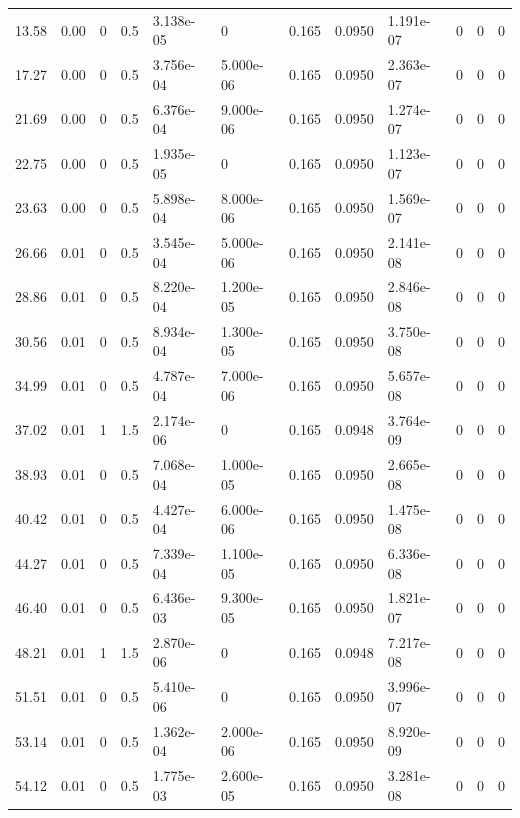 \documentclass[preview]{standalone}
\begin{document}
{{\begin{tabular}{L{1.2cm}C{1.2cm} C{0.3cm}C{0.5cm} C{1.4cm}C{1.4cm} C{1.4cm}C{1.4cm} C{1.6cm}C{1.6cm} C{1.6cm}C{1.6cm}}
  13.58  &  0.00  & 0     & 0.5 &  3.138e-05  & 0  &  0.165&   0.0950& 1.191e-07 & 0   &  0 & 0  \\ 
  17.27  &  0.00  & 0     & 0.5 &  3.756e-04  & 5.000e-06  &  0.165&   0.0950& 2.363e-07 & 0   &  0 & 0  \\ 
  21.69  &  0.00  & 0     & 0.5 &  6.376e-04  & 9.000e-06  &  0.165&   0.0950& 1.274e-07 & 0   &  0 & 0  \\ 
  22.75  &  0.00  & 0     & 0.5 &  1.935e-05  & 0  &  0.165&   0.0950& 1.123e-07 & 0   &  0 & 0  \\ 
  23.63  &  0.00  & 0     & 0.5 &  5.898e-04  & 8.000e-06  &  0.165&   0.0950& 1.569e-07 & 0   &  0 & 0  \\ 
  26.66  &  0.01  & 0     & 0.5 &  3.545e-04  & 5.000e-06  &  0.165&   0.0950& 2.141e-08 & 0   &  0 & 0  \\ 
  28.86  &  0.01  & 0     & 0.5 &  8.220e-04  & 1.200e-05  &  0.165&   0.0950& 2.846e-08 & 0   &  0 & 0  \\ 
  30.56  &  0.01  & 0     & 0.5 &  8.934e-04  & 1.300e-05  &  0.165&   0.0950& 3.750e-08 & 0   &  0 & 0  \\ 
  34.99  &  0.01  & 0     & 0.5 &  4.787e-04  & 7.000e-06  &  0.165&   0.0950& 5.657e-08 & 0   &  0 & 0  \\ 
  37.02  &  0.01  & 1     & 1.5 &  2.174e-06  & 0  &  0.165&   0.0948& 3.764e-09 & 0   &  0 & 0  \\ 
  38.93  &  0.01  & 0     & 0.5 &  7.068e-04  & 1.000e-05  &  0.165&   0.0950& 2.665e-08 & 0   &  0 & 0  \\ 
  40.42  &  0.01  & 0     & 0.5 &  4.427e-04  & 6.000e-06  &  0.165&   0.0950& 1.475e-08 & 0   &  0 & 0  \\ 
  44.27  &  0.01  & 0     & 0.5 &  7.339e-04  & 1.100e-05  &  0.165&   0.0950& 6.336e-08 & 0   &  0 & 0  \\ 
  46.40  &  0.01  & 0     & 0.5 &  6.436e-03  & 9.300e-05  &  0.165&   0.0950& 1.821e-07 & 0   &  0 & 0  \\ 
  48.21  &  0.01  & 1     & 1.5 &  2.870e-06  & 0  &  0.165&   0.0948& 7.217e-08 & 0   &  0 & 0  \\ 
  51.51  &  0.01  & 0     & 0.5 &  5.410e-06  & 0  &  0.165&   0.0950& 3.996e-07 & 0   &  0 & 0  \\ 
  53.14  &  0.01  & 0     & 0.5 &  1.362e-04  & 2.000e-06  &  0.165&   0.0950& 8.920e-09 & 0   &  0 & 0  \\ 
  54.12  &  0.01  & 0     & 0.5 &  1.775e-03  & 2.600e-05  &  0.165&   0.0950& 3.281e-08 & 0   &  0 & 0  \\ 

\end{tabular}}}
\end{document}
